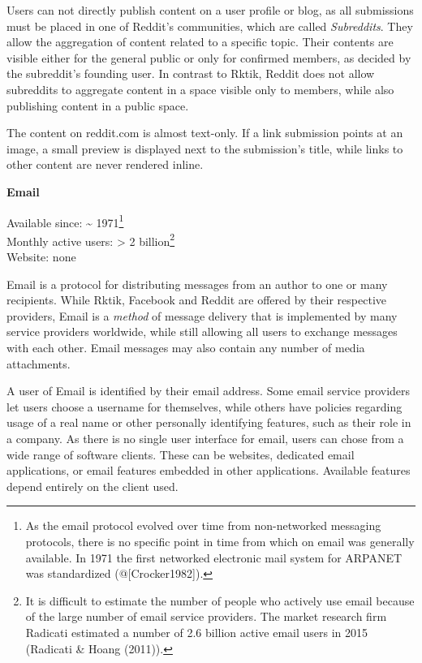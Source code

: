 Users can not directly publish content on a user profile or blog, as all
submissions must be placed in one of Reddit's communities, which are
called \emph{Subreddits}. They allow the aggregation of content related
to a specific topic. Their contents are visible either for the general
public or only for confirmed members, as decided by the subreddit's
founding user. In contrast to Rktik, Reddit does not allow subreddits to
aggregate content in a space visible only to members, while also
publishing content in a public space.

The content on reddit.com is almost text-only. If a link submission
points at an image, a small preview is displayed next to the
submission's title, while links to other content are never rendered
inline.

\textbf{Email}

Available since: \textasciitilde{} 1971\footnote{As the email protocol
  evolved over time from non-networked messaging protocols, there is no
  specific point in time from which on email was generally available. In
  1971 the first networked electronic mail system for ARPANET was
  standardized (@{[}Crocker1982{]}).}\\
Monthly active users: \textgreater{} 2 billion\footnote{It is difficult
  to estimate the number of people who actively use email because of the
  large number of email service providers. The market research firm
  Radicati estimated a number of 2.6 billion active email users in 2015
  (Radicati \& Hoang (2011)).}\\
Website: none

Email is a protocol for distributing messages from an author to one or
many recipients. While Rktik, Facebook and Reddit are offered by their
respective providers, Email is a \emph{method} of message delivery that
is implemented by many service providers worldwide, while still allowing
all users to exchange messages with each other. Email messages may also
contain any number of media attachments.

A user of Email is identified by their email address. Some email service
providers let users choose a username for themselves, while others have
policies regarding usage of a real name or other personally identifying
features, such as their role in a company. As there is no single user
interface for email, users can chose from a wide range of software
clients. These can be websites, dedicated email applications, or email
features embedded in other applications. Available features depend
entirely on the client used.

